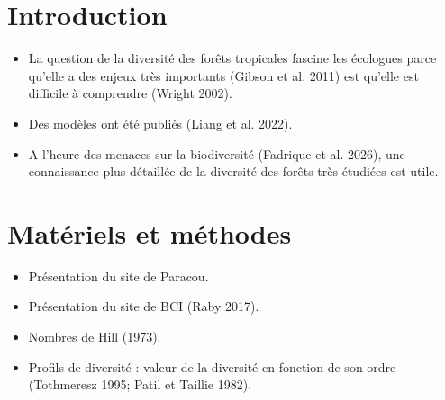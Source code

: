 \documentclass[
  french,
  11pt,
]{stylisharticle}
\affiliation{%
      \textsuperscript{1}%
      Dummy Organization%
      , Scientific Department%
      , Somewhere%
      , City%
      , Country%
      , 9999%
    }
\providecommand{\tightlist}{%
  \setlength{\itemsep}{0pt}\setlength{\parskip}{0pt}}
\begin{document}
\flushbottom

\maketitle

\tableofcontents

\thispagestyle{empty}

\section{Introduction}\label{introduction}

\begin{itemize}
\tightlist
\item
  La question de la diversité des forêts tropicales fascine les
  écologues parce qu'elle a des enjeux très importants ({Gibson et al.}
  2011) est qu'elle est difficile à comprendre (Wright 2002).
\item
  Des modèles ont été publiés ({Liang et al.} 2022).
\item
  A l'heure des menaces sur la biodiversité ({Fadrique et al.} 2026),
  une connaissance plus détaillée de la diversité des forêts très
  étudiées est utile.
\end{itemize}

\section{Matériels et méthodes}\label{matuxe9riels-et-muxe9thodes}

\begin{itemize}
\tightlist
\item
  Présentation du site de Paracou.
\end{itemize}

\begin{itemize}
\tightlist
\item
  Présentation du site de BCI (Raby 2017).
\end{itemize}

\begin{itemize}
\tightlist
\item
  Nombres de Hill (1973).
\item
  Profils de diversité : valeur de la diversité en fonction de son ordre
  (Tothmeresz 1995; Patil et Taillie 1982).
\end{itemize}
\end{document}
